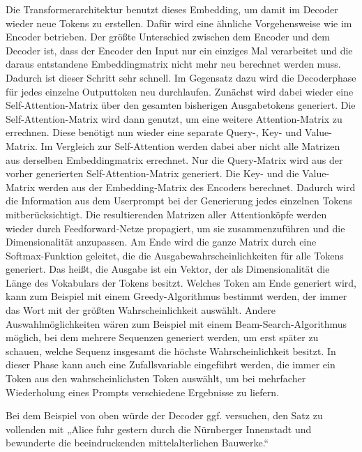 Die Transformerarchitektur benutzt dieses Embedding, um damit im Decoder wieder neue Tokens zu erstellen.
Dafür wird eine ähnliche Vorgehensweise wie im Encoder betrieben.
Der größte Unterschied zwischen dem Encoder und dem Decoder ist, dass der Encoder den Input nur ein einziges Mal verarbeitet und die daraus entstandene Embeddingmatrix nicht mehr neu berechnet werden muss.
Dadurch ist dieser Schritt sehr schnell.
Im Gegensatz dazu wird die Decoderphase für jedes einzelne Outputtoken neu durchlaufen.
Zunächst wird dabei wieder eine Self-Attention-Matrix über den gesamten bisherigen Ausgabetokens generiert.
Die Self-Attention-Matrix wird dann genutzt, um eine weitere Attention-Matrix zu errechnen.
Diese benötigt nun wieder eine separate Query-, Key- und Value-Matrix.
Im Vergleich zur Self-Attention werden dabei aber nicht alle Matrizen aus derselben Embeddingmatrix errechnet.
Nur die Query-Matrix wird aus der vorher generierten Self-Attention-Matrix generiert.
Die Key- und die Value-Matrix werden aus der Embedding-Matrix des Encoders berechnet.
Dadurch wird die Information aus dem Userprompt bei der Generierung jedes einzelnen Tokens mitberücksichtigt.
Die resultierenden Matrizen aller Attentionköpfe werden wieder durch Feedforward-Netze propagiert, um sie zusammenzuführen und die Dimensionalität anzupassen.
Am Ende wird die ganze Matrix durch eine Softmax-Funktion geleitet, die die Ausgabewahrscheinlichkeiten für alle Tokens generiert.
Das heißt, die Ausgabe ist ein Vektor, der als Dimensionalität die Länge des Vokabulars der Tokens besitzt.
Welches Token am Ende generiert wird, kann zum Beispiel mit einem Greedy-Algorithmus bestimmt werden, der immer das Wort mit der größten Wahrscheinlichkeit auswählt.
Andere Auswahlmöglichkeiten wären zum Beispiel mit einem Beam-Search-Algorithmus möglich, bei dem mehrere Sequenzen generiert werden, um erst später zu schauen, welche Sequenz insgesamt die höchste Wahrscheinlichkeit besitzt.
In dieser Phase kann auch eine Zufallsvariable eingeführt werden, die immer ein Token aus den wahrscheinlichsten Token auswählt, um bei mehrfacher Wiederholung eines Prompts verschiedene Ergebnisse zu liefern.

Bei dem Beispiel von oben würde der Decoder ggf. versuchen, den Satz zu vollenden mit „Alice fuhr gestern durch die Nürnberger Innenstadt und bewunderte die beeindruckenden mittelalterlichen Bauwerke.“~\cite{vaswani2023}



